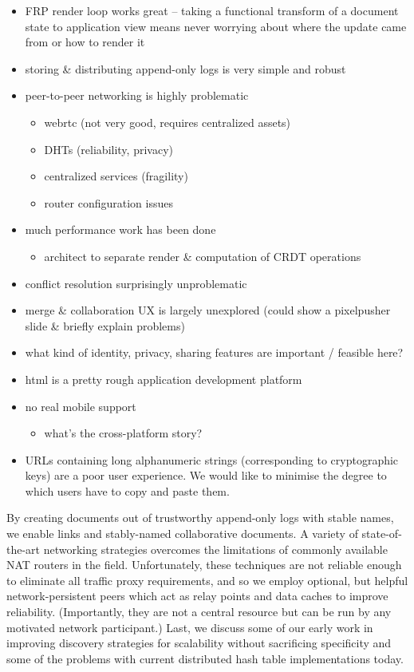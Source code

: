 \documentclass[sigplan,10pt]{acmart}
\begin{document}
\begin{itemize}
    \item FRP render loop works great -- taking a functional transform of a document state to application view means never worrying about where the update came from or how to render it
	\item storing \& distributing append-only logs is very simple and robust
    \item peer-to-peer networking is highly problematic
    \begin{itemize}
	    \item webrtc (not very good, requires centralized assets)
		\item DHTs (reliability, privacy)
		\item centralized services (fragility)
		\item router configuration issues
	\end{itemize}
	\item much performance work has been done
	\begin{itemize}
	    \item architect to separate render \& computation of CRDT operations
	\end{itemize}
	\item conflict resolution surprisingly unproblematic
	\item merge \& collaboration UX is largely unexplored (could show a pixelpusher slide \& briefly explain problems)
	\item what kind of identity, privacy, sharing features are important / feasible here?
	\item html is a pretty rough application development platform
	\item no real mobile support
	\begin{itemize}
	    \item what's the cross-platform story?
	\end{itemize}
	\item URLs containing long alphanumeric strings (corresponding to cryptographic keys) are a poor user experience. We would like to minimise the degree to which users have to copy and paste them.
\end{itemize}

By creating documents out of trustworthy append-only logs with stable names, we enable links and stably-named collaborative documents. A variety of state-of-the-art networking strategies overcomes the limitations of commonly available NAT routers in the field. Unfortunately, these techniques are not reliable enough to eliminate all traffic proxy requirements, and so we employ optional, but helpful network-persistent peers which act as relay points and data caches to improve reliability. (Importantly, they are not a central resource but can be run by any motivated network participant.) Last, we discuss some of our early work in improving discovery strategies for scalability without sacrificing specificity and some of the problems with current distributed hash table implementations today.
\end{document}
